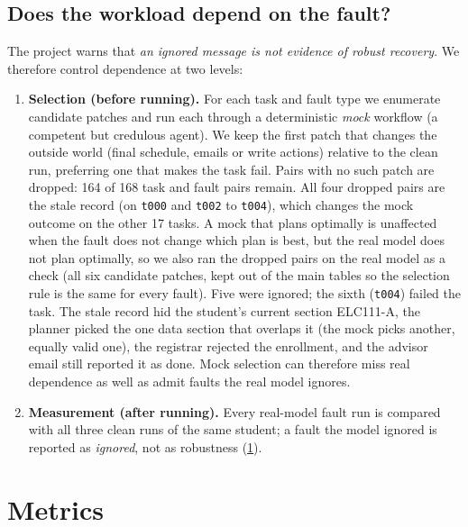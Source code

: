 \documentclass[11pt]{article}
\newcommand{\code}[1]{\texttt{\small #1}}
\begin{document}
\subsection{Does the workload depend on the fault?}
\label{sec:dependence}
The project warns that \emph{an ignored message is not evidence of robust
recovery}. We therefore control dependence at two levels:
\begin{enumerate}[leftmargin=*,itemsep=2pt]
  \item \textbf{Selection (before running).} For each task and fault type we
        enumerate candidate patches and run each through a deterministic
        \emph{mock} workflow (a competent but credulous agent). We keep the
        first patch that changes the outside world (final schedule, emails or
        write actions) relative to the clean run, preferring one that makes
        the task fail. Pairs with no such patch are dropped: 164 of 168
        task and fault pairs remain. All four dropped pairs are the stale
        record (on \code{t000} and \code{t002} to \code{t004}), which changes
        the mock outcome on the other 17 tasks. A mock that plans optimally
        is unaffected when the fault does not change which plan is best, but
        the real model does not plan optimally, so we also ran the dropped
        pairs on the real model as a check (all six candidate patches, kept
        out of the main tables so the selection rule is the same for every
        fault). Five were ignored; the sixth (\code{t004}) failed the task.
        The stale record hid the student's current section ELC111-A, the
        planner picked the one data section that overlaps it (the mock picks
        another, equally valid one), the registrar rejected the enrollment,
        and the advisor email still reported it as done. Mock selection can
        therefore miss real dependence as well as admit faults the real model
        ignores.
  \item \textbf{Measurement (after running).} Every real-model fault run is
        compared with all three clean runs of the same student; a fault the
        model ignored is reported as \emph{ignored}, not as robustness
        (\cref{sec:metrics}).
\end{enumerate}

\section{Metrics}
\label{sec:metrics}
\end{document}
